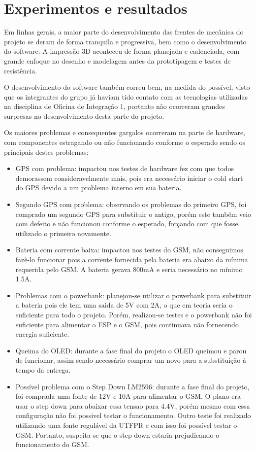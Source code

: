\chapter{Experimentos e resultados}
Em linhas gerais, a maior parte do desenvolvimento das frentes de mecânica do projeto se deram de forma tranquila e progressiva, bem como o desenvolvimento do software. A impressão 3D aconteceu de forma planejada e cadenciada, com grande enfoque no desenho e modelagem antes da prototipagem e testes de resistência. 

O desenvolvimento do software também correu bem, na medida do possível, visto que os integrantes do grupo já haviam tido contato com as tecnologias utilizadas na disciplina de Oficina de Integração 1, portanto não ocorreram grandes surpresas no desenvolvimento desta parte do projeto.

Os maiores problemas e consequentes gargalos ocorreram na parte de hardware, com componentes estragando ou não funcionando conforme o esperado sendo os principais destes problemas:
    
\begin{itemize}
  \item GPS com problema: impactou nos testes de hardware fez com que todos demorassem consideravelmente mais, pois era necessário iniciar o cold start do GPS devido a um problema interno em sua bateria.
  \item Segundo GPS com problema: observando os problemas do primeiro GPS, foi comprado um segundo GPS para substituir o antigo, porém este também veio com defeito e não funcionou conforme o esperado, forçando com que fosse utilizado o primeiro novamente.
  \item Bateria com corrente baixa: impactou nos testes do GSM, não conseguimos fazê-lo funcionar pois a corrente fornecida pela bateria era abaixo da mínima requerida pelo GSM. A bateria gerava 800mA e seria necessário no mínimo 1.5A.
  \item Problemas com o powerbank: planejou-se utilizar o powerbank para substituir a bateria pois ele tem uma saida de 5V com 2A, o que em teoria seria o suficiente para todo o projeto. Porém, realizou-se testes e o powerbank não foi suficiente para alimentar o ESP e o GSM, pois continuava não fornecendo energia suficiente.
  \item Queima do OLED: durante a fase final do projeto o OLED queimou e parou de funcionar, assim sendo necessário comprar um novo para a substituição à tempo da entrega.
  \item Possível problema com o Step Down LM2596: durante a fase final do projeto, foi comprada uma fonte de 12V e 10A para alimentar o GSM. O plano era usar o step down para abaixar essa tensao para 4.4V, porém mesmo com essa configuração não foi possivel testar o funcionamento. Outro teste foi realizado utilizando uma fonte regulável da UTFPR e com isso foi possível testar o GSM. Portanto, suspeita-se que o step down estaria prejudicando o funcionamento do GSM.
\end{itemize}

